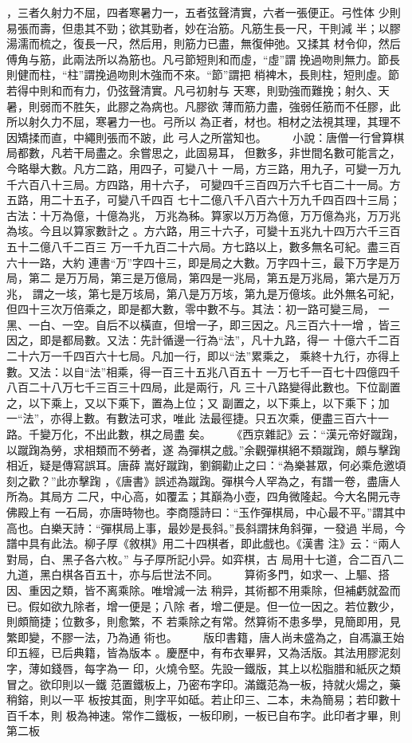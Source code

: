 \documentclass{ctexart}
\begin{document}
，三者久射力不屈，四者寒暑力一，五者弦聲清實，六者一張便正。弓性体 少則易張而壽，但患其不勁；欲其勁者，妙在治筋。凡筋生長一尺，干則減 半；以膠湯濡而梳之，復長一尺，然后用，則筋力已盡，無復伸弛。又揉其 材令仰，然后傅角与筋，此兩法所以為筋也。凡弓節短則和而虛，``虛''謂 挽過吻則無力。節長則健而柱，``柱''謂挽過吻則木強而不來。``節''謂把 梢裨木，長則柱，短則虛。節若得中則和而有力，仍弦聲清實。凡弓初射与 天寒，則勁強而難挽；射久、天暑，則弱而不胜矢，此膠之為病也。凡膠欲 薄而筋力盡，強弱任筋而不任膠，此所以射久力不屈，寒暑力一也。弓所以 為正者，材也。相材之法視其理，其理不因矯揉而直，中繩則張而不跛，此 弓人之所當知也。 　　小說：唐僧一行曾算棋局都數，凡若干局盡之。余嘗思之，此固易耳， 但數多，非世間名數可能言之，今略舉大數。凡方二路，用四子，可變八十 一局，方三路，用九子，可變一万九千六百八十三局。方四路，用十六子， 可變四千三百四万六千七百二十一局。方五路，用二十五子，可變八千四百 七十二億八千八百六十万九千四百四十三局；古法：十万為億，十億為兆， 万兆為秭。算家以万万為億，万万億為兆，万万兆為垓。今且以算家數計之 。方六路，用三十六子，可變十五兆九十四万六千三百五十二億八千二百三 万一千九百二十六局。方七路以上，數多無名可紀。盡三百六十一路，大約 連書``万''字四十三，即是局之大數。万字四十三，最下万字是万局，第二 是万万局，第三是万億局，第四是一兆局，第五是万兆局，第六是万万兆， 謂之一垓，第七是万垓局，第八是万万垓，第九是万億垓。此外無名可紀， 但四十三次万倍乘之，即是都大數，零中數不与。其法：初一路可變三局， 一黑、一白、一空。自后不以橫直，但增一子，即三因之。凡三百六十一增 ，皆三因之，即是都局數。又法：先計循邊一行為``法''，凡十九路，得一 十億六千二百二十六万一千四百六十七局。凡加一行，即以``法''累乘之， 乘終十九行，亦得上數。又法：以自``法''相乘，得一百三十五兆八百五十 一万七千一百七十四億四千八百二十八万七千三百三十四局，此是兩行，凡 三十八路變得此數也。下位副置之，以下乘上，又以下乘下，置為上位；又 副置之，以下乘上，以下乘下；加一``法''，亦得上數。有數法可求，唯此 法最徑捷。只五次乘，便盡三百六十一路。千變万化，不出此數，棋之局盡 矣。 　　《西京雜記》云：``漢元帝好蹴踘，以蹴踘為勞，求相類而不勞者，遂 為彈棋之戲。''余觀彈棋絕不類蹴踘，頗与擊踘相近，疑是傳寫誤耳。唐薛 嵩好蹴踘，劉鋼勸止之曰：``為樂甚眾，何必乘危邀頃刻之歡？''此亦擊踘 ，《唐書》誤述為蹴踘。彈棋今人罕為之，有譜一卷，盡唐人所為。其局方 二尺，中心高，如覆盂；其巔為小壺，四角微隆起。今大名開元寺佛殿上有 一石局，亦唐時物也。李商隱詩曰：``玉作彈棋局，中心最不平。''謂其中 高也。白樂天詩：``彈棋局上事，最妙是長斜。''長斜謂抹角斜彈，一發過 半局，今譜中具有此法。柳子厚《敘棋》用二十四棋者，即此戲也。《漢書 注》云：``兩人對局，白、黑子各六枚。'' 与子厚所記小异。如弈棋，古 局用十七道，合二百八二九道，黑白棋各百五十，亦与后世法不同。 　　算術多門，如求一、上驅、搭因、重因之類，皆不离乘除。唯增減一法 稍异，其術都不用乘除，但補虧就盈而已。假如欲九除者，增一便是；八除 者，增二便是。但一位一因之。若位數少，則頗簡捷；位數多，則愈繁，不 若乘除之有常。然算術不患多學，見簡即用，見繁即變，不膠一法，乃為通 術也。 　　版印書籍，唐人尚未盛為之，自馮瀛王始印五經，已后典籍，皆為版本 。慶歷中，有布衣畢昇，又為活版。其法用膠泥刻字，薄如錢唇，每字為一 印，火燒令堅。先設一鐵版，其上以松脂腊和紙灰之類冒之。欲印則以一鐵 范置鐵板上，乃密布字印。滿鐵范為一板，持就火煬之，藥稍鎔，則以一平 板按其面，則字平如砥。若止印三、二本，未為簡易；若印數十百千本，則 极為神速。常作二鐵板，一板印刷，一板已自布字。此印者才畢，則第二板 
\end{document}
